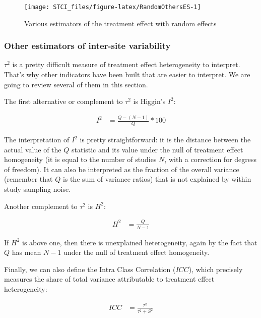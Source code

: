 \documentclass[]{book}
\theoremstyle{definition}
\theoremstyle{definition}
\theoremstyle{definition}
\theoremstyle{remark}
\begin{document}
\begin{figure}[htbp]

{\centering \texttt{[image: STCI\_files/figure-latex/RandomOthersES-1]} 

}

\caption{Various estimators of the treatment effect with random effects}\label{fig:RandomOthersES}
\end{figure}

\subsubsection{Other estimators of inter-site
variability}\label{other-estimators-of-inter-site-variability}

\(\tau^2\) is a pretty difficult measure of treatment effect
heterogeneity to interpret. That's why other indicators have been built
that are easier to interpret. We are going to review several of them in
this section.

The first alternative or complement to \(\tau^2\) is Higgin's \(I^2\):

\begin{align*}
  I^2 & = \frac{Q-(N-1)}{Q}*100
\end{align*}

The interpretation of \(I^2\) is pretty straightforward: it is the
distance between the actual value of the \(Q\) statistic and its value
under the null of treatment effect homogeneity (it is equal to the
number of studies \(N\), with a correction for degress of freedom). It
can also be interpreted as the fraction of the overall variance
(remember that \(Q\) is the sum of variance ratios) that is not
explained by within study sampling noise.

Another complement to \(\tau^2\) is \(H^2\):

\begin{align*}
  H^2 & = \frac{Q}{N-1}
\end{align*}

If \(H^2\) is above one, then there is unexplained heterogeneity, again
by the fact that \(Q\) has mean \(N-1\) under the null of treatment
effect homogeneity.

Finally, we can also define the Intra Class Correlation (\(ICC\)), which
precisely measures the share of total variance attributable to treatment
effect heterogeneity:

\begin{align*}
  ICC & = \frac{\tau^2}{\tau^2+S^2}
\end{align*}
\end{document}
